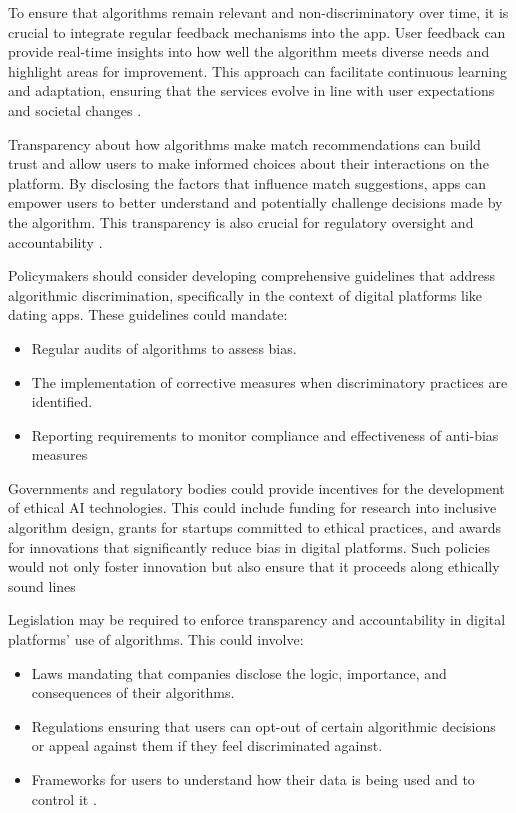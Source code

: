 To ensure that algorithms remain relevant and non-discriminatory over time, it is crucial to integrate regular feedback mechanisms into the app. User feedback can provide real-time insights into how well the algorithm meets diverse needs and highlight areas for improvement. This approach can facilitate continuous learning and adaptation, ensuring that the services evolve in line with user expectations and societal changes \cite{Kalra_Gupta_Varghese_Rangaswamy_2023}.

Transparency about how algorithms make match recommendations can build trust and allow users to make informed choices about their interactions on the platform. By disclosing the factors that influence match suggestions, apps can empower users to better understand and potentially challenge decisions made by the algorithm. This transparency is also crucial for regulatory oversight and accountability \cite{PASQUALE_2015}.

Policymakers should consider developing comprehensive guidelines that address algorithmic discrimination, specifically in the context of digital platforms like dating apps. These guidelines could mandate:

\begin{itemize}
    \item Regular audits of algorithms to assess bias.
    \item The implementation of corrective measures when discriminatory practices are identified.
    \item Reporting requirements to monitor compliance and effectiveness of anti-bias measures \cite{Eubanks_2018}
\end{itemize}

Governments and regulatory bodies could provide incentives for the development of ethical AI technologies. This could include funding for research into inclusive algorithm design, grants for startups committed to ethical practices, and awards for innovations that significantly reduce bias in digital platforms. Such policies would not only foster innovation but also ensure that it proceeds along ethically sound lines \cite{Crawford_Calo_2016}

Legislation may be required to enforce transparency and accountability in digital platforms' use of algorithms. This could involve:

\begin{itemize}
    \item Laws mandating that companies disclose the logic, importance, and consequences of their algorithms.
    \item Regulations ensuring that users can opt-out of certain algorithmic decisions or appeal against them if they feel discriminated against.
    \item Frameworks for users to understand how their data is being used and to control it \cite{Kaminsiki_2019}.
\end{itemize}

